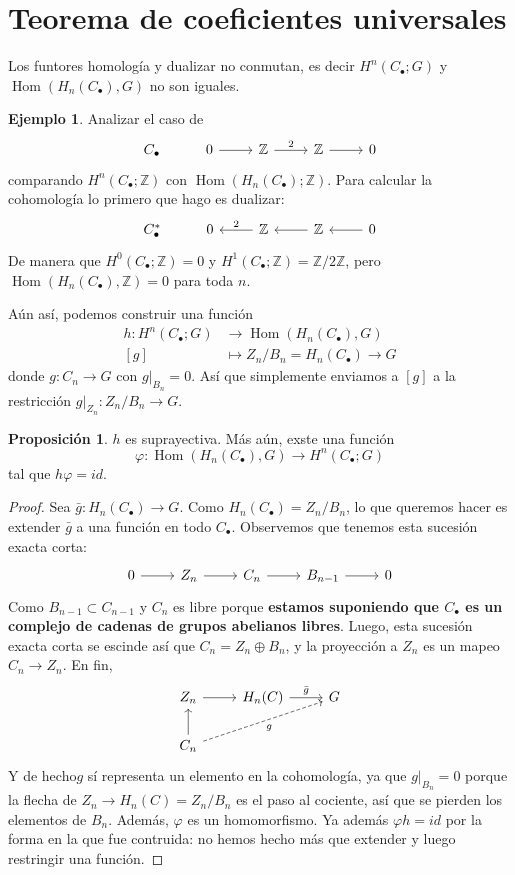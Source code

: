 \documentclass[spanish]{book}
\theoremstyle{definition}
\newtheorem*{prop}{Proposición}
\newtheorem*{ejem}{Ejemplo}
\newcommand{\Z}{\mathbb{Z}}
\DeclareMathOperator{\Hom}{Hom}
\begin{document}
\section{Teorema de coeficientes universales}
	Los funtores homología y dualizar no conmutan, es decir $H^n(C_\bullet;G)$ y $\Hom(H_n(C_\bullet),G)$ no son iguales.
\begin{ejem}
	Analizar el caso de 
	\[\begin{tikzcd}
		C_\bullet&0\arrow[r]&\Z\arrow[r,"2"]&\Z\arrow[r]&0
	\end{tikzcd}\]
	comparando $H^n(C_\bullet;\Z)$ con $\Hom(H_n(C_\bullet);\Z)$.
	Para calcular la cohomología lo primero que hago es dualizar:
	\[\begin{tikzcd}
		C^*_\bullet&0&\Z\arrow[l,swap,"2"]&\Z\arrow[l]&0\arrow[l]
	\end{tikzcd}\]
	De manera que $H^0(C_\bullet;\Z)=0$ y $H^1(C_\bullet;\Z)=\Z/2\Z$, pero $\Hom(H_n(C_\bullet),\Z)=0$ para toda $n$.
\end{ejem}
Aún así, podemos construir una función
\begin{align*}
	h:H^n(C_\bullet;G)&\to\Hom(H_n(C_\bullet),G)\\
	[g]&\mapsto Z_n/B_n=H_n(C_\bullet)\to G
\end{align*}
donde $g:C_n\to G$ con $g|_{B_n}=0 $. Así que simplemente enviamos a $[g]$ a la restricción $g|_{Z_n}:Z_n/B_n\to G$.
\begin{prop}
	$h$ es suprayectiva. Más aún, exste una función 
	\[\varphi:\Hom(H_n(C_\bullet),G)\to H^n(C_\bullet;G)\]
	tal que $h\varphi=id$.
\end{prop}
\begin{proof}
	Sea $\bar{g}:H_n(C_\bullet)\to G$. Como $H_n(C_\bullet)=Z_n/B_n$, lo que queremos hacer es extender $\bar{g}$ a una función en todo $C_\bullet$. Observemos que tenemos esta sucesión exacta corta:
	\[\begin{tikzcd}
		0\arrow[r]&Z_n\arrow[r]&C_n\arrow[r]&B_{n-1}\arrow[r]&0
	\end{tikzcd}\]
	Como $B_{n-1}\subset C_{n-1}$ y $C_n$ es libre porque \textbf{estamos suponiendo que $C_\bullet$ es un complejo de cadenas de grupos abelianos libres}. Luego, esta sucesión exacta corta se escinde así que $C_n=Z_n\oplus B_n$, y la proyección a $Z_n$ es un mapeo $C_n\to Z_n$. En fin,
	\[\begin{tikzcd}
		Z_n\arrow[r]&H_n(C)\arrow[r,"\bar{g}"]&G\\
		C_n\arrow[u]\arrow[rru,swap,dashed,"g"]
	\end{tikzcd}\]
	Y de hecho$g$ sí representa un elemento en la cohomología, ya que $g|_{B_n}=0$ porque la flecha de $Z_n\to H_n(C)=Z_n/B_n$ es el paso al cociente, así que se pierden los elementos de $B_n$. Además, $\varphi$ es un homomorfismo. Ya además $\varphi h=id$ por la forma en la que fue contruida: no hemos hecho más que extender y luego restringir una función.
\end{proof}
\end{document}
